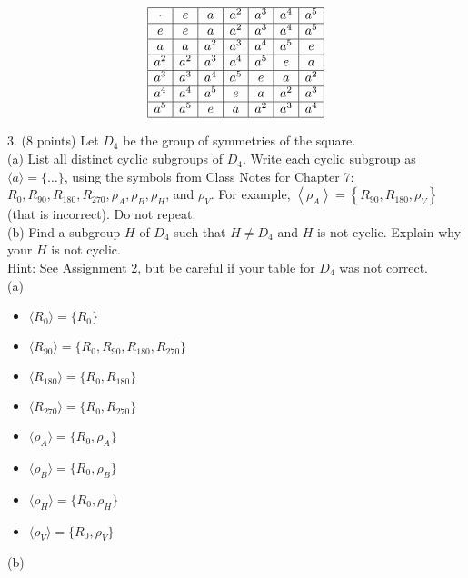 \documentclass[12pt]{article}
\begin{document}
$$
\begin{array}{|c|c|c|c|c|c|c|}
\hline
\cdot & e & a & a^2 & a^3 & a^4 & a^5 \\
\hline
e & e & a & a^2 & a^3 & a^4 & a^5 \\
\hline
a & a & a^2 & a^3 & a^4 & a^5 & e \\
\hline
a^2 & a^2 & a^3 & a^4 & a^5 & e & a \\
\hline
a^3 & a^3 & a^4 & a^5 & e & a & a^2 \\
\hline
a^4 & a^4 & a^5 & e & a & a^2 & a^3 \\
\hline
a^5 & a^5 & e & a & a^2 & a^3 & a^4 \\
\hline
\end{array}
$$

\newpage

3. (8 points) Let $D_{4}$ be the group of symmetries of the square. \\

(a) List all distinct cyclic subgroups of $D_{4}$. Write each cyclic subgroup as $\langle a\rangle=\{\ldots\}$, using the symbols from Class Notes for Chapter 7: $R_{0}, R_{90}, R_{180}, R_{270}, \rho_{A}, \rho_{B}, \rho_{H}$, and $\rho_{V}$. For example, $\left\langle\rho_{A}\right\rangle=\left\{R_{90}, R_{180}, \rho_{V}\right\}$ (that is incorrect). Do not repeat. \\

(b) Find a subgroup $H$ of $D_{4}$ such that $H \neq D_{4}$ and $H$ is not cyclic. Explain why your $H$ is not cyclic. \\

Hint: See Assignment 2, but be careful if your table for $D_{4}$ was not correct. \\

(a)
\begin{itemize}
    \item \( \langle R_{0} \rangle = \{R_{0}\} \)%
    \item \( \langle R_{90} \rangle = \{R_{0}, R_{90}, R_{180}, R_{270}\} \)
    \item \( \langle R_{180} \rangle = \{R_{0}, R_{180}\} \)
    \item \( \langle R_{270} \rangle = \{R_{0}, R_{270}\} \)
    \item \( \langle \rho_{A} \rangle = \{R_{0}, \rho_{A}\} \)
    \item \( \langle \rho_{B} \rangle = \{R_{0}, \rho_{B}\} \)
    \item \( \langle \rho_{H} \rangle = \{R_{0}, \rho_{H}\} \)
    \item \( \langle \rho_{V} \rangle = \{R_{0}, \rho_{V}\} \)
\end{itemize}
(b)
\end{document}
